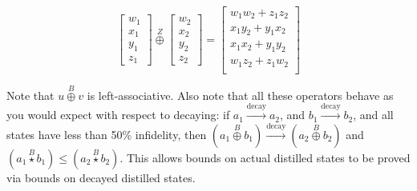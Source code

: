 \documentclass[onecolumn,unpublished,a4paper]{quantumarticle}
\theoremstyle{definition}
\theoremstyle{definition}
\theoremstyle{definition}
\begin{document}
\begin{equation}
\begin{bmatrix}w_1\\x_1\\y_1\\z_1\end{bmatrix}
\stackrel{Z}{\oplus}
\begin{bmatrix}w_2\\x_2\\y_2\\z_2\end{bmatrix}
=\begin{bmatrix}
w_1w_2+z_1z_2\\
x_1y_2+y_1x_2\\
x_1x_2+y_1y_2\\
w_1z_2+z_1w_2\\
\end{bmatrix}
\end{equation}

Note that $u \stackrel{B}{\oplus} v$ is left-associative.
Also note that all these operators behave as you would expect with respect to decaying: if $a_1 \xrightarrow{\text{decay}} a_2$, and $b_1 \xrightarrow{\text{decay}} b_2$, and all states have less than 50\% infidelity, then $\left(a_1 \stackrel{B}{\oplus} b_1\right) \xrightarrow{\text{decay}} \left(a_2 \stackrel{B}{\oplus} b_2\right)$ and $\left(a_1 \stackrel{B}{\star} b_1\right) \leq \left(a_2 \stackrel{B}{\star} b_2\right)$.
This allows bounds on actual distilled states to be proved via bounds on decayed distilled states.
\end{document}
